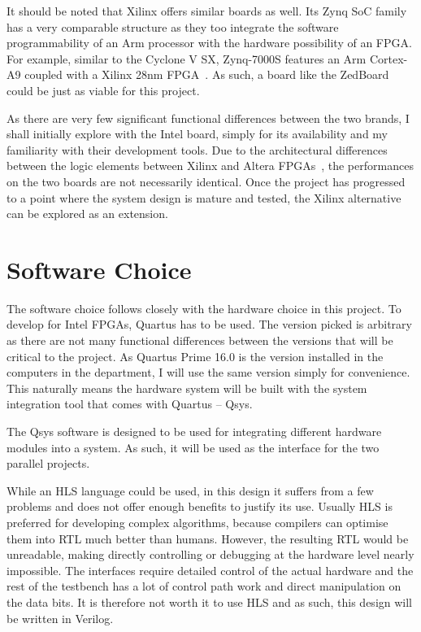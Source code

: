 It should be noted that Xilinx offers similar boards as well.
Its Zynq SoC family has a very comparable structure as they too integrate the software programmability of an Arm processor with the hardware possibility of an FPGA.
For example, similar to the Cyclone V SX, Zynq-7000S features an Arm Cortex-A9
coupled with a Xilinx 28nm FPGA~\cite{Xilinx1}.
As such, a board like the ZedBoard~\cite{Xilinx2} could be just as viable for this project.

As there are very few significant functional differences between the two brands, I shall initially explore with the Intel board, simply for its availability and my familiarity with their development tools.
Due to the architectural differences between the logic elements between Xilinx and Altera FPGAs~\cite{Scekic1}, the performances on the two boards are not necessarily identical.
Once the project has progressed to a point where the system design is mature and tested, the Xilinx alternative can be explored as an extension.

\section{Software Choice}
The software choice follows closely with the hardware choice in this project.
To develop for Intel FPGAs, Quartus has to be used.
The version picked is arbitrary as there are not many functional differences between the versions that will be critical to the project.
As Quartus Prime 16.0 is the version installed in the computers in the department, I will use the same version simply for convenience.
This naturally means the hardware system will be built with the system integration tool that comes with Quartus -- Qsys.

The Qsys software is designed to be used for integrating different hardware modules into a system.
As such, it will be used as the interface for the two parallel projects.

While an HLS language could be used, in this design it suffers from a few problems and does not offer enough benefits to justify its use.
Usually HLS is preferred for developing complex algorithms, because compilers can optimise them into RTL much better than humans.
However, the resulting RTL would be unreadable, making directly controlling or debugging at the hardware level nearly impossible.
The interfaces require detailed control of the actual hardware and the rest of the testbench has a lot of control path work and direct manipulation on the data bits.
It is therefore not worth it to use HLS and as such, this design will be written in Verilog.

